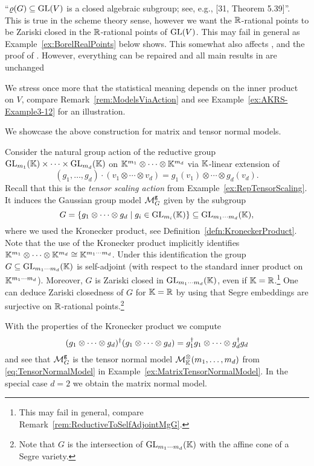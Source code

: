 \begin{remark}
	``$\varrho(G) \subseteq \operatorname{GL}(V)$ is a closed algebraic subgroup; see, e.g., [31, Theorem 5.39]''. This is true in the scheme theory sense, however we want the $\mathbb R$-rational points to be Zariski closed in the $\mathbb R$-rational points of $\operatorname{GL}(V)$. This may fail in general as Example~\ref{ex:BorelRealPoints} below shows. This somewhat also affects \cite[Remark~3.11]{SiagaPaper}, and the proof of \cite[Theorem~4.1]{SiagaPaper}. However, everything can be repaired and all main results in \cite{SiagaPaper} are unchanged
	
	We stress once more that the statistical meaning depends on the inner product on $V$, compare Remark~\ref{rem:ModelsViaAction} and see Example~\ref{ex:AKRS-Example3-12} for an illustration.
	\hfill\remSymbol
\end{remark}

We showcase the above construction for matrix and tensor normal models.

\begin{example} \label{ex:MatrixTensorAsMgG}
	Consider the natural group action of the reductive group $\operatorname{GL}_{m_1}(\mathbb K) \times \cdots \times \operatorname{GL}_{m_d}(\mathbb K)$ on $\mathbb K^{m_1} \otimes \cdots \otimes \mathbb K^{m_d}$ via $\mathbb K$-linear extension of
		\[ (g_1, \ldots, g_d) \cdot (v_1 \otimes \cdots \otimes v_d) = g_1(v_1) \otimes \cdots \otimes g_d(v_d). \]
	Recall that this is the \emph{tensor scaling action} from Example~\ref{ex:RepTensorScaling}. It induces the Gaussian group model $\mathcal{M}^{\mathtt{g}}_G$ given by the subgroup
		\[G = \left\lbrace g_1 \otimes \cdots \otimes g_d \mid g_i \in \operatorname{GL}_{m_i}(\mathbb K) \right\rbrace \subseteq \operatorname{GL}_{m_1 \cdots m_d}(\mathbb K) , \]
	where we used the Kronecker product, see Definition~\ref{defn:KroneckerProduct}. Note that the use of the Kronecker product implicitly identifies $\mathbb K^{m_1} \otimes \cdots \otimes \mathbb K^{m_d} \cong \mathbb K^{m_1 \cdots m_d}$.
	Under this identification the group $G \subseteq \operatorname{GL}_{m_1 \cdots m_d}(\mathbb K)$ is self-adjoint (with respect to the standard inner product on $ \mathbb K^{m_1 \cdots m_d}$). Moreover, $G$ is Zariski closed in $\operatorname{GL}_{m_1 \cdots m_d}(\mathbb K)$, even if $\mathbb K = \mathbb R$.\footnote{This may fail in general, compare Remark~\ref{rem:ReductiveToSelfAdjointMgG}.} One can deduce Zariski closedness of $G$ for $\mathbb K = \mathbb R$ by using that Segre embeddings are surjective on $\mathbb R$-rational points.\footnote{Note that $G$ is the intersection of $\operatorname{GL}_{m_1 \cdots m_d}(\mathbb K)$ with the affine cone of a Segre variety.}
	
	With the properties of the Kronecker product we compute
		\[ (g_1 \otimes \cdots \otimes g_d)^{\dagger} (g_1 \otimes \cdots \otimes g_d)
		= g_1^{\dagger} g_1 \otimes \cdots \otimes g_d^{\dagger} g_d \]
	and see that $\mathcal{M}^{\mathtt{g}}_G$ is the tensor normal model $\mathcal{M}^{\otimes}_{\mathbb{K}}(m_1, \ldots, m_d)$ from \eqref{eq:TensorNormalModel} in Example~\ref{ex:MatrixTensorNormalModel}. In the special case $d=2$ we obtain the matrix normal model.
	\hfill\exSymbol
\end{example}

